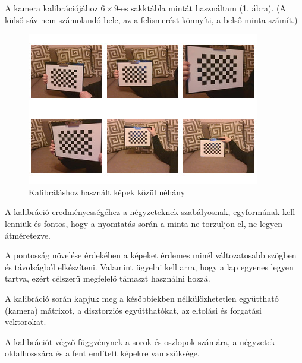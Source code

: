 

A kamera kalibrációjához $6 \times 9$-es sakktábla mintát használtam (\ref{fig:calibration}. ábra). (A külső sáv nem számolandó bele, az a felismerést könnyíti, a belső minta számít.)

\begin{figure}[htp]
	\centering
	\includegraphics[scale=1]{images/calibration.jpg}
	\caption{Kalibráláshoz használt képek közül néhány}
	\label{fig:calibration}
\end{figure}

A kalibráció eredményességéhez a négyzeteknek szabályosnak, egyformának kell lenniük és fontos, hogy a nyomtatás során a minta ne torzuljon el, ne legyen átméretezve.

A pontosság növelése érdekében a képeket érdemes minél változatosabb szögben és távolságból elkészíteni. Valamint ügyelni kell arra, hogy a lap egyenes legyen tartva, ezért célszerű megfelelő támaszt használni hozzá.

A kalibráció során kapjuk meg a későbbiekben nélkülözhetetlen együttható (kamera) mátrixot, a disztorziós együtthatókat, az eltolási és forgatási vektorokat.

A kalibrációt végző függvénynek a sorok és oszlopok számára, a négyzetek oldalhosszára és a fent említett képekre van szüksége.

